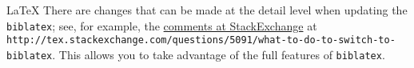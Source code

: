 \begin{chapter}{\LaTeX}
There are changes that can be made at the detail level when updating the \verb|biblatex|; see, for example, the \href{http://tex.stackexchange.com/questions/5091/what-to-do-to-switch-to-biblatex}{comments at StackExchange} at \\ \verb|http://tex.stackexchange.com/questions/5091/what-to-do-to-switch-to-biblatex|. This allows you to take advantage of the full features of \verb|biblatex|.

\end{chapter}
